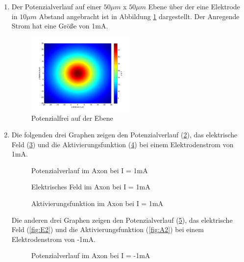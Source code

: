 \documentclass[conference]{IEEEtran}
\begin{document}
\begin{enumerate}
\item Der Potenzialverlauf auf einer $50\mu m$ x $50\mu m$ Ebene über der eine Elektrode in $10\mu m$ Abstand angebracht ist in Abbildung \ref{fig:potField} dargestellt. Der Anregende Strom hat eine Größe von 1mA.

\begin{figure}[h]
	\centering
	\includegraphics[width=0.5\textwidth]{img/potField.png}
	\caption{Potenzialfrei auf der Ebene}
	\label{fig:potField}
\end{figure}

\item Die folgenden drei Graphen zeigen den Potenzialverlauf (\ref{fig:Phi1}), das elektrische Feld (\ref{fig:E1}) und die Aktivierungsfunktion (\ref{fig:A1}) bei einem Elektrodenstrom von 1mA.\\

\begin{figure}[h!]
  	\centering
    \scalebox{.6}{}
    \caption{Potenzialverlauf im Axon bei I = 1mA}
    \label{fig:Phi1}
\end{figure}

\begin{figure}[h!]
  	\centering
    \scalebox{.6}{}
    \caption{Elektrisches Feld im Axon bei I = 1mA}
    \label{fig:E1}
\end{figure}

\begin{figure}[h!]
  	\centering
    \scalebox{.6}{}
    \caption{Aktivierungsfunktion im Axon bei I = 1mA}
    \label{fig:A1}
\end{figure}

Die anderen drei Graphen zeigen den Potenzialverlauf (\ref{fig:Phi2}), das elektrische Feld (\ref{fig:E2}) und die Aktivierungsfunktion (\ref{fig:A2}) bei einem Elektrodenstrom von -1mA.

\begin{figure}[h!]
  	\centering
    \scalebox{.6}{}
    \caption{Potenzialverlauf im Axon bei I = -1mA}
    \label{fig:Phi2}
\end{figure}


\end{enumerate}
\end{document}
